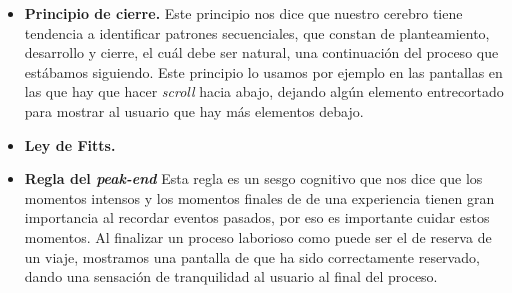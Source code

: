 \begin{itemize}
      \item \textbf{Principio de cierre.} Este principio nos dice que nuestro cerebro tiene tendencia a identificar patrones secuenciales, que constan de planteamiento, desarrollo y cierre,
            el cuál debe ser natural, una continuación del proceso que estábamos siguiendo. Este principio lo usamos por ejemplo en las pantallas en las que hay que hacer \textit{scroll} hacia abajo,
            dejando algún elemento entrecortado para mostrar al usuario que hay más elementos debajo.
      \item \textbf{Ley de Fitts.} 
      \item \textbf{Regla del \textit{peak-end}} Esta regla es un sesgo cognitivo que nos dice que los momentos intensos y los momentos finales de
            de una experiencia tienen gran importancia al recordar eventos pasados, por eso es importante cuidar estos momentos. Al finalizar un proceso laborioso como
            puede ser el de reserva de un viaje, mostramos una pantalla de que ha sido correctamente reservado, dando una sensación de tranquilidad al usuario
            al final del proceso.

\end{itemize}
